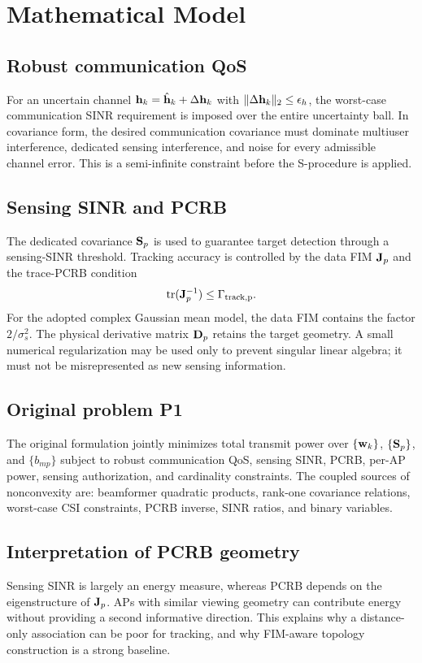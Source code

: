 \chapter{Mathematical Model}

\section{Robust communication QoS}
For an uncertain channel $\mathbf{h}_k=\hat{\mathbf{h}}_k+\Delta\mathbf{h}_k$ with
$\|\Delta\mathbf{h}_k\|_2\leq\epsilon_h$, the worst-case communication SINR
requirement is imposed over the entire uncertainty ball. In covariance form,
the desired communication covariance must dominate multiuser interference,
dedicated sensing interference, and noise for every admissible channel error.
This is a semi-infinite constraint before the S-procedure is applied.

\section{Sensing SINR and PCRB}
The dedicated covariance $\mathbf{S}_p$ is used to guarantee target detection
through a sensing-SINR threshold. Tracking accuracy is controlled by the data
FIM $\mathbf{J}_p$ and the trace-PCRB condition
\[
 \operatorname{tr}(\mathbf{J}_p^{-1})\leq\Gamma_{\rm track,p}.
\]
For the adopted complex Gaussian mean model, the data FIM contains the factor
$2/\sigma_s^2$. The physical derivative matrix $\mathbf{D}_p$ retains the target
geometry. A small numerical regularization may be used only to prevent singular
linear algebra; it must not be misrepresented as new sensing information.

\section{Original problem P1}
The original formulation jointly minimizes total transmit power over
$\{\mathbf{w}_k\}$, $\{\mathbf{S}_p\}$, and $\{b_{mp}\}$ subject to robust
communication QoS, sensing SINR, PCRB, per-AP power, sensing authorization, and
cardinality constraints. The coupled sources of nonconvexity are: beamformer
quadratic products, rank-one covariance relations, worst-case CSI constraints,
PCRB inverse, SINR ratios, and binary variables.

\section{Interpretation of PCRB geometry}
Sensing SINR is largely an energy measure, whereas PCRB depends on the
eigenstructure of $\mathbf{J}_p$. APs with similar viewing geometry can contribute
energy without providing a second informative direction. This explains why a
distance-only association can be poor for tracking, and why FIM-aware topology
construction is a strong baseline.

